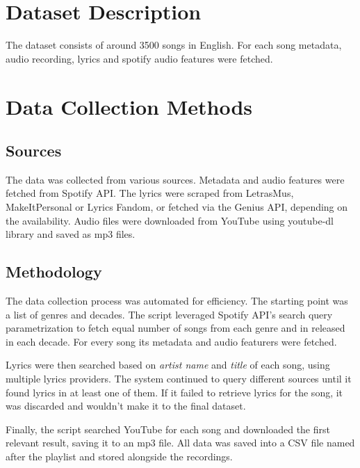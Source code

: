 
\section{Dataset Description}
\label{sec:datasetdescription}

The dataset consists of around 3500 songs in English. For each song metadata, audio
recording, lyrics and spotify audio features were fetched.

\section{Data Collection Methods}
\label{sec:datacollectionmethods}

\subsection{Sources}
The data was collected from various sources. Metadata and audio features were
fetched from Spotify API. The lyrics were scraped from LetrasMus,
MakeItPersonal or Lyrics Fandom, or fetched via the Genius API, depending on
the availability. Audio files were downloaded from YouTube using youtube-dl
library and saved as mp3 files.\cite{spotify_api} \cite{makeitpersonal}
\cite{genius} \cite{letras_mus} \cite{lyricsfandom} \cite{ytdl} 

\subsection{Methodology}
The data collection process was automated for efficiency. The starting point
was a list of genres and decades. The script leveraged Spotify API's search
query parametrization to fetch equal number of songs from each genre and in
released in  each decade. For every song its metadata and audio featurers were
fetched.

Lyrics were then searched based on \textit{artist name} and \textit{title} of
each song, using multiple lyrics providers. The system continued to query
different sources until it found lyrics in at least one of them. If it failed
to retrieve lyrics for the song, it was discarded and wouldn't make it to the
final dataset.

Finally, the script  searched YouTube for each song and downloaded the first
relevant result, saving it to an mp3 file. All data was saved into a CSV
file named after the playlist and stored alongside the recordings.


